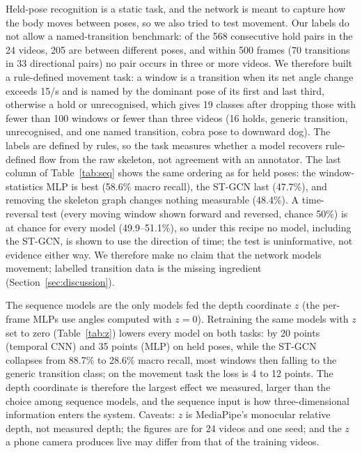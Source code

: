  Held-pose recognition is a static task, and the network is meant to capture how the body moves between poses, so we also tried to test movement. Our labels do not allow a named-transition benchmark: of the 568 consecutive hold pairs in the 24 videos, 205 are between different poses, and within 500 frames (70 transitions in 33 directional pairs) no pair occurs in three or more videos. We therefore built a rule-defined movement task: a window is a transition when its net angle change exceeds 15\textdegree/s and is named by the dominant pose of its first and last third, otherwise a hold or unrecognised, which gives 19 classes after dropping those with fewer than 100 windows or fewer than three videos (16 holds, generic transition, unrecognised, and one named transition, cobra pose to downward dog). The labels are defined by rules, so the task measures whether a model recovers rule-defined flow from the raw skeleton, not agreement with an annotator. The last column of Table~\ref{tab:seq} shows the same ordering as for held poses: the window-statistics MLP is best (58.6\% macro recall), the ST-GCN last (47.7\%), and removing the skeleton graph changes nothing measurable (48.4\%). A time-reversal test (every moving window shown forward and reversed, chance 50\%) is at chance for every model (49.9--51.1\%), so under this recipe no model, including the ST-GCN, is shown to use the direction of time; the test is uninformative, not evidence either way. We therefore make no claim that the network models movement; labelled transition data is the missing ingredient (Section~\ref{sec:discussion}).

 The sequence models are the only models fed the depth coordinate $z$ (the per-frame MLPs use angles computed with $z{=}0$). Retraining the same models with $z$ set to zero (Table~\ref{tab:z}) lowers every model on both tasks: by 20 points (temporal CNN) and 35 points (MLP) on held poses, while the ST-GCN collapses from 88.7\% to 28.6\% macro recall, most windows then falling to the generic transition class; on the movement task the loss is 4 to 12 points. The depth coordinate is therefore the largest effect we measured, larger than the choice among sequence models, and the sequence input is how three-dimensional information enters the system. Caveats: $z$ is MediaPipe's monocular relative depth, not measured depth; the figures are for 24 videos and one seed; and the $z$ a phone camera produces live may differ from that of the training videos.

